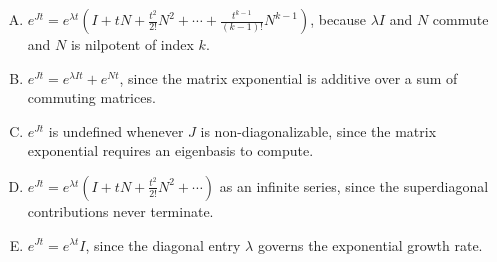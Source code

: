 \documentclass[12pt]{amsart}
\begin{document}
\begin{enumerate}[(A)]
\item $e^{Jt} = e^{\lambda t}\!\left(I + tN + \tfrac{t^2}{2!}N^2 + \cdots + \tfrac{t^{k-1}}{(k-1)!}N^{k-1}\right)$, because $\lambda I$ and $N$ commute and $N$ is nilpotent of index $k$.
\item $e^{Jt} = e^{\lambda I t} + e^{Nt}$, since the matrix exponential is additive over a sum of commuting matrices.
\item $e^{Jt}$ is undefined whenever $J$ is non-diagonalizable, since the matrix exponential requires an eigenbasis to compute.
\item $e^{Jt} = e^{\lambda t}\!\left(I + tN + \tfrac{t^2}{2!}N^2 + \cdots\right)$ as an infinite series, since the superdiagonal contributions never terminate.
\item $e^{Jt} = e^{\lambda t} I$, since the diagonal entry $\lambda$ governs the exponential growth rate.
\end{enumerate}
\end{document}
